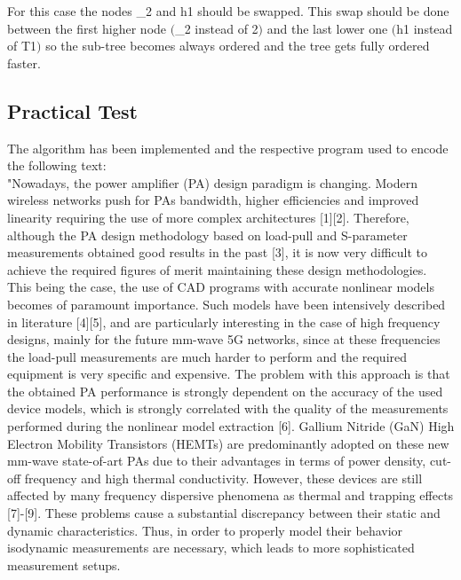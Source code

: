 \begin{refsection}
For this case the nodes \_2 and h1 should be swapped. This swap should be done between the first higher node $($\_2 instead of 2$)$ and the last lower one $($h1 instead of T1$)$ so the sub-tree becomes always ordered and the tree gets fully ordered faster. 

\subsection{Practical Test}

\hspace{5mm} The algorithm has been implemented and the respective program used to encode the following text:\\
{\tiny "Nowadays, the power amplifier (PA) design paradigm is changing. Modern wireless networks push for PAs bandwidth, higher efficiencies and improved linearity requiring the use of more complex architectures [1][2]. Therefore, although the PA design methodology based on load-pull and S-parameter measurements obtained good results in the past [3], it is now very difficult to achieve the required figures of merit maintaining these design methodologies. This being the case, the use of CAD programs with accurate nonlinear models becomes of paramount importance. Such models have been intensively described in literature [4][5], and are particularly interesting in the case of high frequency designs, mainly for the future mm-wave 5G networks, since at these frequencies the load-pull measurements are much harder to perform and the required equipment is very specific and expensive. The problem with this approach is that the obtained PA performance is strongly dependent on the accuracy of the used device models, which is strongly correlated with the quality of the measurements performed during the nonlinear model extraction [6].
Gallium Nitride (GaN) High Electron Mobility Transistors (HEMTs) are predominantly adopted on these new mm-wave state-of-art PAs due to their advantages in terms of power density, cut-off frequency and high thermal conductivity. However, these devices are still affected by many frequency dispersive phenomena as thermal and trapping effects [7]-[9]. These problems cause a substantial discrepancy between their static and dynamic characteristics. Thus, in order to properly model their behavior isodynamic measurements are necessary, which leads to more sophisticated measurement setups. 
}
\end{refsection}
